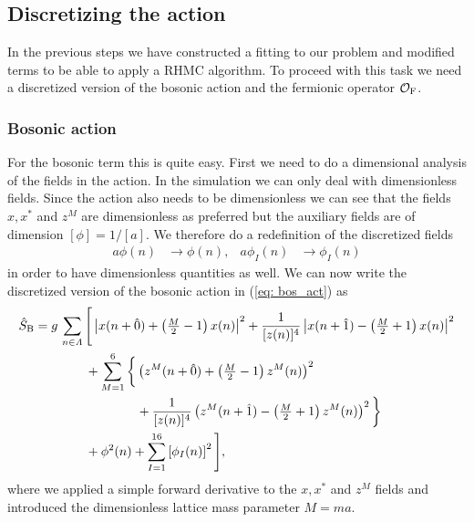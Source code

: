 \subsection{Discretizing the action}
In the previous steps we have constructed a  fitting to our problem and modified terms to be able to apply a RHMC algorithm. To proceed with this task we need a discretized version of the bosonic action and the fermionic operator $\mathcal{O}_{\rm F}$. 
%
%
%
%
%
%
\subsubsection{Bosonic action}
For the bosonic term this is quite easy. First we need to do a dimensional analysis of the fields in the action. In the simulation we can only deal with dimensionless fields. Since the action also needs to be dimensionless we can see that the fields $x,x^{*}$ and $z^{M}$ are dimensionless as preferred but the auxiliary fields are of dimension $[\phi]=1/[a]$. We therefore do a redefinition of the discretized fields
%
%
\begin{align}
a\phi(n) &\to \phi(n), & a\phi_{I}(n) &\to \phi_{I}(n)
\end{align}
%
%
in order to have dimensionless quantities as well. We can now write the discretized version of the bosonic action in (\ref{eq: bos_act}) as
%
%
\begin{align}
\hat{S}_{\rm B} &= g\, \sum\limits_{n\in\mathit{\Lambda}} \Bigg[ \left\vert x(n+\hat{0}) + \left(\tfrac{M}{2}-1\right) x(n) \right\vert^{2} 
+ \frac{1}{[z(n)]^{4}} \left\vert x(n+\hat{1}) - \left(\tfrac{M}{2}+1\right) x(n) \right\vert^{2} \notag\\
%
%
&\qquad\qquad + \sum\limits_{M=1}^{6} \bigg\lbrace \left(z^{M}(n+\hat{0}) + \left(\tfrac{M}{2} -1\right)z^{M}(n) \right)^{2} \\
%
%
&\qquad\qquad\qquad\qquad + \frac{1}{[z(n)]^{4}} \left( z^{M}(n+\hat{1}) -\left(\tfrac{M}{2}+1\right) z^{M}(n) \right)^{2} \bigg\rbrace \notag \\
&\qquad\qquad +\phi^{2}(n) + \sum\limits_{I=1}^{16}\left[\phi_{I}(n)\right]^{2} \Bigg], \notag
\end{align}
%
%
where we applied a simple forward derivative to the $x,x^{*}$ and $z^{M}$ fields and introduced the dimensionless lattice mass parameter $M=ma$.
%
%
%
%
%
%
%
%
